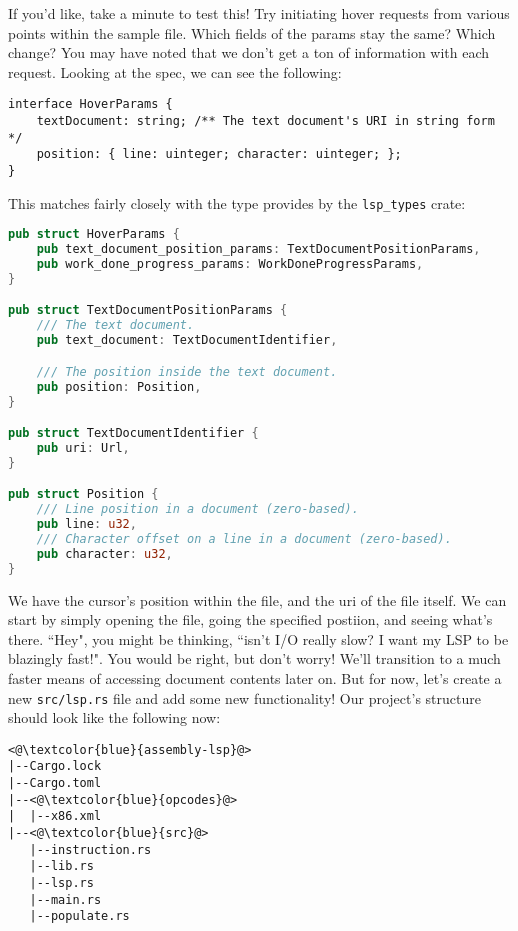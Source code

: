 If you'd like, take a minute to test this! Try initiating hover requests from various
points within the sample file. Which fields of the params stay the same? Which change?
You may have noted that we don't get a ton of information with each request. Looking
at the spec, we can see the following:

\begin{lstlisting}
interface HoverParams {
	textDocument: string; /** The text document's URI in string form */
	position: { line: uinteger; character: uinteger; };
}
\end{lstlisting}

This matches fairly closely with the type provides by the \texttt{lsp\_types} crate:

\begin{lstlisting}[language=rust]
pub struct HoverParams {
    pub text_document_position_params: TextDocumentPositionParams,
    pub work_done_progress_params: WorkDoneProgressParams,
}

pub struct TextDocumentPositionParams {
    /// The text document.
    pub text_document: TextDocumentIdentifier,

    /// The position inside the text document.
    pub position: Position,
}

pub struct TextDocumentIdentifier {
    pub uri: Url,
}

pub struct Position {
    /// Line position in a document (zero-based).
    pub line: u32,
    /// Character offset on a line in a document (zero-based).
    pub character: u32,
}
\end{lstlisting}

We have the cursor's position within the file, and the uri of the file itself. We
can start by simply opening the file, going the specified postiion, and seeing what's
there. ``Hey", you might be thinking, ``isn't I/O really slow? I want my LSP to
be blazingly fast!". You would be right, but don't worry! We'll transition to a
much faster means of accessing document contents later on. But for now, let's create
a new \texttt{src/lsp.rs} file and add some new functionality! Our project's structure
should look like the following now:

\begin{lstlisting}
<@\textcolor{blue}{assembly-lsp}@>
|--Cargo.lock
|--Cargo.toml
|--<@\textcolor{blue}{opcodes}@>
|  |--x86.xml
|--<@\textcolor{blue}{src}@>
   |--instruction.rs
   |--lib.rs
   |--lsp.rs
   |--main.rs
   |--populate.rs
\end{lstlisting}

